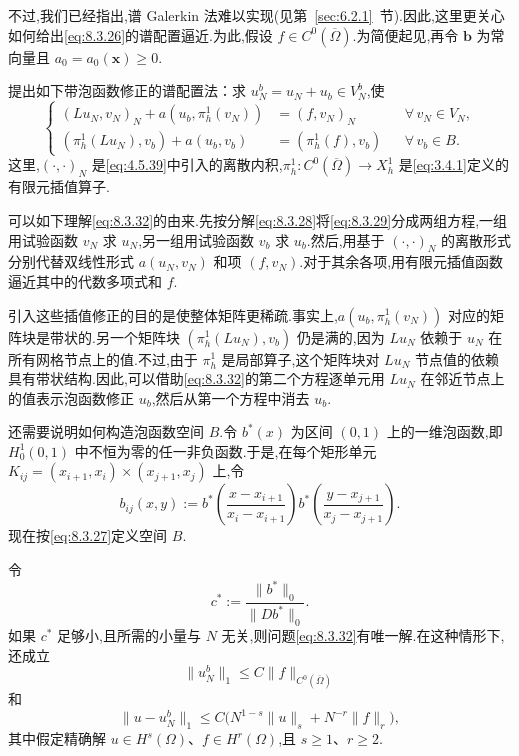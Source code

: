 不过,我们已经指出,谱 Galerkin 法难以实现(见第~\ref{sec:6.2.1}~节).因此,这里更关心如何给出\eqref{eq:8.3.26}的谱配置逼近.为此,假设 \(f\in C^0(\overline\Omega)\).为简便起见,再令 \(\boldsymbol{b}\) 为常向量且 \(a_0=a_0(\boldsymbol{x})\ge0\).

提出如下带泡函数修正的谱配置法：求 \(u_N^b=u_N+u_b\in V_N^b\),使
\begin{equation}\label{eq:8.3.32}
  \left\{
  \begin{aligned}
    (Lu_N,v_N)_N+a(u_b,\pi_h^1(v_N))
      &=(f,v_N)_N&&\forall\,v_N\in V_N,\\
    (\pi_h^1(Lu_N),v_b)+a(u_b,v_b)
      &=(\pi_h^1(f),v_b)&&\forall\,v_b\in B.
  \end{aligned}
  \right.
\end{equation}
这里,\((\cdot,\cdot)_N\) 是\eqref{eq:4.5.39}中引入的离散内积,\(\pi_h^1\colon C^0(\overline\Omega)\to X_h^1\) 是\eqref{eq:3.4.1}定义的有限元插值算子.

可以如下理解\eqref{eq:8.3.32}的由来.先按分解\eqref{eq:8.3.28}将\eqref{eq:8.3.29}分成两组方程,一组用试验函数 \(v_N\) 求 \(u_N\),另一组用试验函数 \(v_b\) 求 \(u_b\).然后,用基于 \((\cdot,\cdot)_N\) 的离散形式分别代替双线性形式 \(a(u_N,v_N)\) 和项 \((f,v_N)\).对于其余各项,用有限元插值函数逼近其中的代数多项式和 \(f\).

引入这些插值修正的目的是使整体矩阵更稀疏.事实上,\(a(u_b,\pi_h^1(v_N))\) 对应的矩阵块是带状的.另一个矩阵块 \((\pi_h^1(Lu_N),v_b)\) 仍是满的,因为 \(Lu_N\) 依赖于 \(u_N\) 在所有网格节点上的值.不过,由于 \(\pi_h^1\) 是局部算子,这个矩阵块对 \(Lu_N\) 节点值的依赖具有带状结构.因此,可以借助\eqref{eq:8.3.32}的第二个方程逐单元用 \(Lu_N\) 在邻近节点上的值表示泡函数修正 \(u_b\),然后从第一个方程中消去 \(u_b\).

还需要说明如何构造泡函数空间 \(B\).令 \(b^*(x)\) 为区间 \((0,1)\) 上的一维泡函数,即 \(H_0^1(0,1)\) 中不恒为零的任一非负函数.于是,在每个矩形单元 \(K_{ij}=(x_{i+1},x_i)\times(x_{j+1},x_j)\) 上,令
\begin{equation}\label{eq:8.3.33}
  b_{ij}(x,y):=b^*\left(\frac{x-x_{i+1}}{x_i-x_{i+1}}\right)
    b^*\left(\frac{y-x_{j+1}}{x_j-x_{j+1}}\right).
\end{equation}
现在按\eqref{eq:8.3.27}定义空间 \(B\).

令
\[
  c^*:=\frac{\|b^*\|_0}{\|Db^*\|_0}.
\]
如果 \(c^*\) 足够小,且所需的小量与 \(N\) 无关,则问题\eqref{eq:8.3.32}有唯一解.在这种情形下,还成立
\[
  \|u_N^b\|_1\le C\|f\|_{C^0(\overline\Omega)}
\]
和
\[
  \|u-u_N^b\|_1\le C\bigl(N^{1-s}\|u\|_s+N^{-r}\|f\|_r\bigr),
\]
其中假定精确解 \(u\in H^s(\Omega)\)、\(f\in H^r(\Omega)\),且 \(s\ge1\)、\(r\ge2\).

